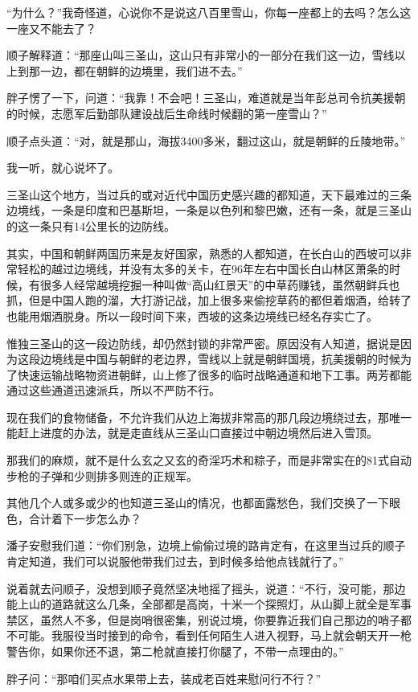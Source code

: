 “为什么？”我奇怪道，心说你不是说这八百里雪山，你每一座都上的去吗？怎么这一座又不能去了？

顺子解释道：“那座山叫三圣山，这山只有非常小的一部分在我们这一边，雪线以上到那一边，都在朝鲜的边境里，我们进不去。”

胖子愣了一下，问道：“我靠！不会吧！三圣山，难道就是当年彭总司令抗美援朝的时候，志愿军后勤部队建设战后生命线时候翻的第一座雪山？”

顺子点头道：“对，就是那山，海拔3400多米，翻过这山，就是朝鲜的丘陵地带。”

我一听，就心说坏了。

三圣山这个地方，当过兵的或对近代中国历史感兴趣的都知道，天下最难过的三条边境线，一条是印度和巴基斯坦，一条是以色列和黎巴嫩，还有一条，就是三圣山的这一条只有14公里长的边防线。

其实，中国和朝鲜两国历来是友好国家，熟悉的人都知道，在长白山的西坡可以非常轻松的越过边境线，并没有太多的关卡，在96年左右中国长白山林区萧条的时候，有很多人经常越境挖掘一种叫做“高山红景天”的中草药赚钱，虽然朝鲜兵也抓，但是中国人跑的溜，大打游记战，加上很多来偷挖草药的都但着烟酒，给转了也能用烟酒脱身。所以一段时间下来，西坡的这条边境线已经名存实亡了。

惟独三圣山的这一段边防线，却仍然封锁的非常严密。原因没有人知道，据说是因为这段边境线是中国与朝鲜的老边界，雪线以上就是朝鲜国境，抗美援朝的时候为了快速运输战略物资进朝鲜，山上修了很多的临时战略通道和地下工事。两芳都能通过这些通道迅速派兵，所以不严防不行。

现在我们的食物储备，不允许我们从边上海拔非常高的那几段边境绕过去，那唯一能赶上进度的办法，就是走直线从三圣山口直接过中朝边境然后进入雪顶。

那我们的麻烦，就不是什么玄之又玄的奇淫巧术和粽子，而是非常实在的81式自动步枪的子弹和少则排多则连的正规军。

其他几个人或多或少的也知道三圣山的情况，也都面露愁色，我们交换了一下眼色，合计着下一步怎么办？

潘子安慰我们道：“你们别急，边境上偷偷过境的路肯定有，在这里当过兵的顺子肯定知道，我们可以说服他带我们过去，到时候多给他点钱就行了。”

说着就去问顺子，没想到顺子竟然坚决地摇了摇头，说道：“不行，没可能，那边能上山的道路就这么几条，全部都是高岗，十米一个探照灯，从山脚上就全是军事禁区，虽然人不多，但是岗哨很密集，别说过境，你要靠近我们自己那边的哨子都不可能。我服役当时接到的命令，看到任何陌生人进入视野，马上就会朝天开一枪警告你，如果你还不退，第二枪就直接打你腿了，不带一点理由的。”

胖子问：“那咱们买点水果带上去，装成老百姓来慰问行不行？”

